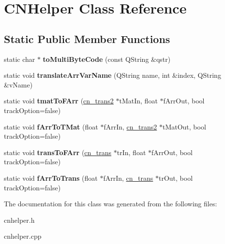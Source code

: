 \hypertarget{classCNHelper}{\section{C\-N\-Helper Class Reference}
\label{classCNHelper}
}
\subsection*{Static Public Member Functions}
\begin{DoxyCompactItemize}
\item 
\hypertarget{classCNHelper_a524e2b3cb4ae346436547a797d0c1d67}{static char $\ast$ {\bfseries to\-Multi\-Byte\-Code} (const Q\-String \&qstr)}\label{classCNHelper_a524e2b3cb4ae346436547a797d0c1d67}

\item 
\hypertarget{classCNHelper_a319eab904560ab2d22bf2dd783f4d736}{static void {\bfseries translate\-Arr\-Var\-Name} (Q\-String name, int \&index, Q\-String \&v\-Name)}\label{classCNHelper_a319eab904560ab2d22bf2dd783f4d736}

\item 
\hypertarget{classCNHelper_a1a70c4e82e10712870404383e1981a13}{static void {\bfseries tmat\-To\-F\-Arr} (\hyperlink{structcn__trans2}{cn\-\_\-trans2} $\ast$t\-Mat\-In, float $\ast$f\-Arr\-Out, bool track\-Option=false)}\label{classCNHelper_a1a70c4e82e10712870404383e1981a13}

\item 
\hypertarget{classCNHelper_abe90e99f1ce41dfd3b52ae01f36455cd}{static void {\bfseries f\-Arr\-To\-T\-Mat} (float $\ast$f\-Arr\-In, \hyperlink{structcn__trans2}{cn\-\_\-trans2} $\ast$t\-Mat\-Out, bool track\-Option=false)}\label{classCNHelper_abe90e99f1ce41dfd3b52ae01f36455cd}

\item 
\hypertarget{classCNHelper_a11fbe1fa28e86df6675bfb5f9431f592}{static void {\bfseries trans\-To\-F\-Arr} (\hyperlink{structcn__trans}{cn\-\_\-trans} $\ast$tr\-In, float $\ast$f\-Arr\-Out, bool track\-Option=false)}\label{classCNHelper_a11fbe1fa28e86df6675bfb5f9431f592}

\item 
\hypertarget{classCNHelper_a1f0604f49b4c665462aa0379c276be06}{static void {\bfseries f\-Arr\-To\-Trans} (float $\ast$f\-Arr\-In, \hyperlink{structcn__trans}{cn\-\_\-trans} $\ast$tr\-Out, bool track\-Option=false)}\label{classCNHelper_a1f0604f49b4c665462aa0379c276be06}

\end{DoxyCompactItemize}


The documentation for this class was generated from the following files\-:\begin{DoxyCompactItemize}
\item 
cnhelper.\-h\item 
cnhelper.\-cpp\end{DoxyCompactItemize}

